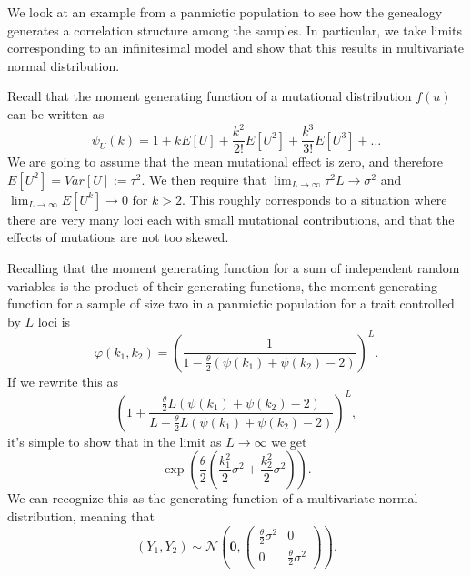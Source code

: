 We look at an example from a panmictic population to see how the genealogy generates a correlation structure among the
samples. In particular, we take limits corresponding to an infinitesimal model and show that this results in multivariate 
normal distribution. 

Recall that the moment generating function of a mutational distribution $f(u)$ can be written as 
\begin{equation*}
  \psi_{U}(k) = 1 + kE\left[ U \right] + \frac{k^2}{2!}E\left[ U^2 \right] + \frac{k^3}{3!}E\left[ U^3\right] + \ldots
\end{equation*}
We are going to assume that the mean mutational effect is zero, and therefore $E[U^2]=Var[U]:=\tau^2$. We then require
that $\lim_{L \to \infty}\tau^2L \to \sigma^2$ and $\lim_{L \to \infty}E[U^k] \to 0$ for $k>2$. This roughly corresponds
to a situation where there are very many loci each with small mutational contributions, and that the effects of
mutations are not too skewed. 

Recalling that the moment generating function for a sum of independent random variables is the product of their
generating functions, the moment generating function for a sample of size two in a panmictic population for a trait
controlled by $L$ loci is
\begin{equation}
  \label{eq:two}
  \varphi(k_1,k_2) = \left( \frac{1}{1-\frac{\theta}{2}(\psi(k_1)+\psi(k_2)-2)}\right)^L.
\end{equation}
If we rewrite this as
\begin{equation*}
  \left( 1 + \frac{\frac{\theta}{2}L(\psi(k_1) + \psi(k_2) -2)}{L-\frac{\theta}{2}L(\psi(k_1) + \psi(k_2) -2)}\right)^L,
\end{equation*}
it's simple to show that in the limit as $L \to \infty$ we get 
\begin{equation}
  \label{eq:limexp}
  \exp\left( \frac{\theta}{2} \left( \frac{k_1^2}{2}\sigma^2 + \frac{k_2^2}{2}\sigma^2 \right)\right).
\end{equation}
We can recognize this as the generating function of a multivariate normal distribution, meaning that 
\begin{equation}
  \label{eq:twodist}
  (Y_1,Y_2) \sim \mathcal{N}\left( \mathbf{0},
    \begin{pmatrix}
      \frac{\theta}{2}\sigma^2 & 0 \\
      0 & \frac{\theta}{2}\sigma^2
    \end{pmatrix}
  \right).
\end{equation}

